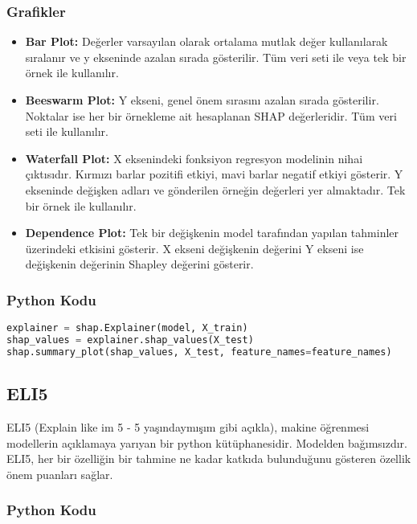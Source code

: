 \subsubsection{Grafikler}

\begin{itemize}
    \item \textbf{Bar Plot:} Değerler varsayılan olarak ortalama mutlak değer kullanılarak sıralanır ve y ekseninde azalan sırada gösterilir. Tüm veri seti ile veya tek bir örnek ile kullanılır.
    \item \textbf{Beeswarm Plot:} Y ekseni, genel önem sırasını azalan sırada gösterilir. Noktalar ise her bir örnekleme ait hesaplanan SHAP değerleridir. Tüm veri seti ile kullanılır.
    \item \textbf{Waterfall Plot:} X eksenindeki fonksiyon regresyon modelinin nihai çıktısıdır. Kırmızı barlar pozitifi etkiyi, mavi barlar negatif etkiyi gösterir. Y ekseninde değişken adları ve gönderilen örneğin değerleri yer almaktadır. Tek bir örnek ile kullanılır.
    \item \textbf{Dependence Plot:} Tek bir değişkenin model tarafından yapılan tahminler üzerindeki etkisini gösterir. X ekseni değişkenin değerini Y ekseni ise değişkenin değerinin Shapley değerini gösterir.
\end{itemize}

\subsubsection{Python Kodu}

\begin{lstlisting}[language=Python]
explainer = shap.Explainer(model, X_train)
shap_values = explainer.shap_values(X_test)
shap.summary_plot(shap_values, X_test, feature_names=feature_names)
\end{lstlisting}

\subsection{ELI5}
ELI5 (Explain like im 5 - 5 yaşındaymışım gibi açıkla), makine öğrenmesi modellerin açıklamaya yarıyan bir python kütüphanesidir. Modelden bağımsızdır. ELI5, her bir özelliğin bir tahmine ne kadar katkıda bulunduğunu gösteren özellik önem puanları sağlar.

\subsubsection{Python Kodu}

